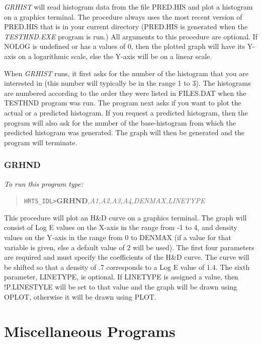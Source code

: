 {\em GRHIST} will read histogram data from the file PRED.HIS and plot a
   histogram on a graphics terminal.  The procedure always uses the most
   recent version of PRED.HIS that is in your current directory (PRED.HIS
   is generated when the {\em TESTHND.EXE} program is run.)  All arguments to
   this procedure are optional.  If NOLOG is undefined or has a values of
   0, then the plotted graph will have its Y-axis on a logarithmic scale,
   else the Y-axis will be on a linear scale.  

       When {\em GRHIST} runs, it first asks for the number of the histogram
   that you are interested in (this number will typically be in the range
   1 to 3).  The histograms are numbered according to the order they
   were listed in FILES.DAT when the TESTHND program was run.  The
   program next asks if you want to plot the actual or a predicted
   histogram.  If you request a predicted histogram, then the program will
   also ask for the number of the base-histogram from which the predicted
   histogram was generated.  The graph will then be generated and the
   program will terminate.

\subsubsection{GRHND}

{\em To run this program type:}
\begin{quote}   
      {\tt HRTS\_IDL>}{\bf GRHND},{\it A1,A2,A3,A4,DENMAX,LINETYPE}       
\end{quote}   
       This procedure will plot an H\&D curve on a graphics terminal.  The
   graph will consist of Log E values on the X-axis in the range from -1
   to 4, and density values on the Y-axis in the range from 0 to DENMAX
   (if a value for that variable is given, else a default value of 2 will
   be used).  The first four parameters are required and must specify the
   coefficients of the H\&D curve.  The curve will be shifted so that a
   density of .7 corresponds to a Log E value of 1.4.  The sixth
   parameter, LINETYPE, is optional.  If LINETYPE is assigned a value,
   then !P.LINESTYLE will be set to that value and the graph will be drawn
   using OPLOT, otherwise it will be drawn using PLOT.
\newpage

\section{Miscellaneous Programs}

